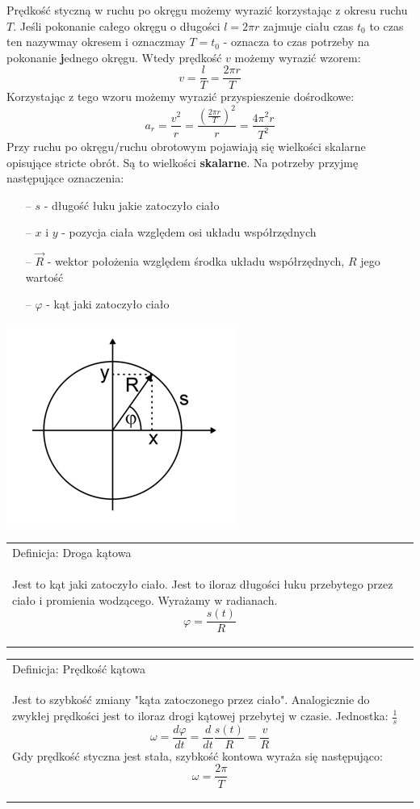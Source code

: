 \documentclass[a4paper]{article}
\newenvironment{definition}[2][Definicja]
    {
        \begin{center}
        \begin{tabular}{|p{1\textwidth}|}
        \hline
            #1: #2\\[2ex]
        \begin{em}
        \Large
    }
    { 
        \end{em}
        \\\hline
        \end{tabular} 
        \end{center}
    }
\begin{document}
    Prędkość styczną w ruchu po okręgu możemy wyrazić korzystając z okresu ruchu $T$.
    Jeśli pokonanie całego okręgu o długości $l = 2\pi r$ zajmuje ciału czas $t_0$ to czas
    ten nazywmay okresem i oznaczmay $T = t_0$ - oznacza to czas potrzeby na pokonanie \textbf 
    jednego okręgu.
    Wtedy prędkość $v$ możemy wyrazić wzorem:
    \[v = \frac{l}{T} = \frac{2\pi r}{T} \]
    Korzystając z tego wzoru możemy wyrazić przyspieszenie dośrodkowe:
    \[a_r = \frac{v^2}{r} = \frac{\left (\frac{2\pi r}{T} \right )^2}{r} = \frac{4\pi^2 r}{T^2}\]
    Przy ruchu po okręgu/ruchu obrotowym pojawiają się wielkości skalarne opisujące stricte obrót. 
    Są to wielkości \textbf{skalarne}. Na potrzeby przyjmę następujące oznaczenia:
    \begin{itemize}
        \item [--] $s$ - długość łuku jakie zatoczyło ciało
        \item [--] $x$ i $y$ - pozycja ciała względem osi układu współrzędnych
        \item [--] $\vec{R}$ - wektor położenia względem środka układu współrzędnych, $R$ jego wartość
        \item [--] $\varphi$ - kąt jaki zatoczyło ciało
    \end{itemize}
    \begin{center}
        \includegraphics{img/ruchokrag2.png}
    \end{center}
    \begin{definition}{Droga kątowa}
        Jest to kąt jaki zatoczyło ciało. Jest to iloraz długości łuku przebytego przez ciało i 
        promienia wodzącego. Wyrażamy w radianach.
        \[\varphi = \frac{s(t)}{R}\]
    \end{definition}
    \begin{definition}{Prędkość kątowa}
        Jest to szybkość zmiany "kąta zatoczonego przez ciało". Analogicznie do zwykłej prędkości jest to 
        iloraz drogi kątowej przebytej w czasie. Jednostka: $\frac{1}{s}$
        \[\omega = \frac{d\varphi}{dt} = \frac{d}{dt} \frac{s(t)}{R} = \frac{v}{R}\]
        Gdy prędkość styczna jest stała, szybkość kontowa wyraża się następująco:
        \[\omega = \frac{2\pi}{T}\]
    \end{definition}
\end{document}
